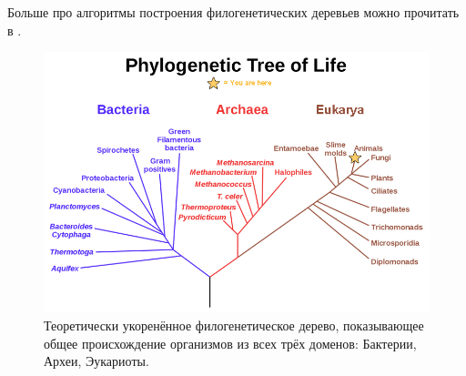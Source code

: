 \documentclass[11pt,a4paper]{report}
\theoremstyle{definition}
\theoremstyle{definition}
\theoremstyle{definition}
\begin{document}
	\noindent Больше про алгоритмы построения филогенетических деревьев можно прочитать в \cite{Hungary}.
	\clearpage
	\begin{figure}[!hbtp]
		\includegraphics[width=\textwidth]{./img/phylogenetic_tree.jpg}
		\caption{Теоретически укоренённое филогенетическое дерево, показывающее общее происхождение организмов из всех трёх доменов: Бактерии, Археи, Эукариоты.}
	\end{figure}
	\clearpage
\end{document}
